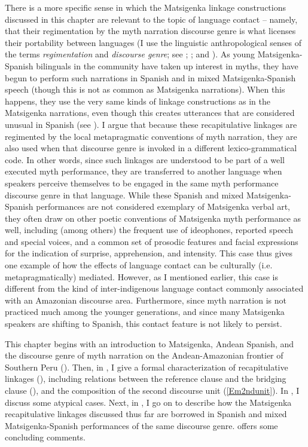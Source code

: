 \documentclass[output=paper]{LSP/langsci}
\begin{document}
There is a more specific sense in which the Matsigenka linkage constructions discussed in this chapter are relevant to the topic of language contact – namely, that their regimentation by the myth narration discourse genre is what licenses their portability between languages (I use the linguistic anthropological senses of the terms \textit{regimentation} and \textit{discourse genre}; see \citealt{briggs.1992}; \citealt{silverstein93}; and ). As young Matsigenka-Spanish bilinguals in the community have taken up interest in myths, they have begun to perform such narrations in Spanish and in mixed Matsigenka-Spanish speech (though this is not as common as Matsigenka narrations). When this happens, they use the very same kinds of linkage constructions as in the Matsigenka narrations, even though this creates utterances that are considered unusual in Spanish (see ). I argue that because these recapitulative linkages are regimented by the local metapragmatic conventions of myth narration, they are also used when that discourse genre is invoked in a different lexico-grammatical code. In other words, since such linkages are understood to be part of a well executed myth performance, they are transferred to another language when speakers perceive themselves to be engaged in the same myth performance discourse genre in that language. While these Spanish and mixed Matsigenka-Spanish performances are not considered exemplary of Matsigenka verbal art, they often draw on other poetic conventions of Matsigenka myth performance as well, including (among others) the frequent use of ideophones, reported speech and special voices, and a common set of prosodic features and facial expressions for the indication of surprise, apprehension, and intensity. This case thus gives one example of how the effects of language contact can be culturally (i.e. metapragmatically) mediated. However, as I mentioned earlier, this case is different from the kind of inter-indigenous language contact commonly associated with an Amazonian discourse area. Furthermore, since myth narration is not practiced much among the younger generations, and since many Matsigenka speakers are shifting to Spanish, this contact feature is not likely to persist.
 
This chapter begins with an introduction to Matsigenka, Andean Spanish, and the discourse genre of myth narration on the Andean-Amazonian frontier of Southern Peru (). Then, in , I give a formal characterization of recapitulative linkages (), including relations between the reference clause and the bridging clause (), and the composition of the second discourse unit (\ref{Em2ndunit}). In , I discuss some atypical cases. Next, in , I go on to describe how the Matsigenka recapitulative linkages discussed thus far are borrowed in Spanish and mixed Matsigenka-Spanish performances of the same discourse genre.  offers some concluding comments.
%
\end{document}
